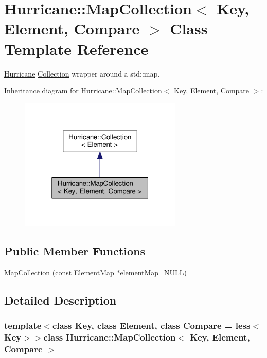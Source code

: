 \hypertarget{classHurricane_1_1MapCollection}{\section{Hurricane\-:\-:Map\-Collection$<$ Key, Element, Compare $>$ Class Template Reference}
\label{classHurricane_1_1MapCollection}
}


\hyperlink{namespaceHurricane}{Hurricane} \hyperlink{classHurricane_1_1Collection}{Collection} wrapper around a std\-::map.  




Inheritance diagram for Hurricane\-:\-:Map\-Collection$<$ Key, Element, Compare $>$\-:\nopagebreak
\begin{figure}[H]
\begin{center}
\leavevmode
\includegraphics[width=220pt]{classHurricane_1_1MapCollection__inherit__graph}
\end{center}
\end{figure}
\subsection*{Public Member Functions}
\begin{DoxyCompactItemize}
\item 
\hyperlink{classHurricane_1_1MapCollection_a0b905fb46ced35815132e5eab62a8de1}{Map\-Collection} (const Element\-Map $\ast$element\-Map=N\-U\-L\-L)
\end{DoxyCompactItemize}


\subsection{Detailed Description}
\subsubsection*{template$<$class Key, class Element, class Compare = less$<$\-Key$>$$>$class Hurricane\-::\-Map\-Collection$<$ Key, Element, Compare $>$}

